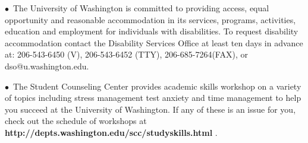 \documentclass[11 pt]{report}
\begin{document}
\noindent $\bullet$\ The University of Washington is committed to providing
access, equal opportunity and reasonable accommodation in its
services, programs, activities, education and employment for
individuals with disabilities.  To request disability accommodation
contact the Disability Services Office at least ten days in advance
at: 206-543-6450 (V), 206-543-6452 (TTY), 206-685-7264(FAX), or
dso@u.washington.edu.

\vspace{.2cm}

\noindent $\bullet$\  The Student Counseling Center provides academic skills
workshop on a variety of topics including stress management test
anxiety and time management to help you succeed at the University of
Washington. If any of these is an issue for you, check out the
schedule of workshops at {\bf
http://depts.washington.edu/scc/studyskills.html} .
\end{document}
